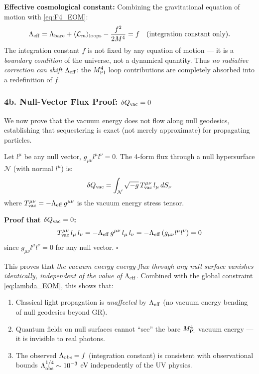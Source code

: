 \textbf{Effective cosmological constant:}
Combining the gravitational equation of motion with \eqref{eq:F4_EOM}:
\begin{equation}
\Lambda_{\rm eff} = \Lambda_{\rm bare} + \langle \mathcal{L}_m \rangle_{\rm loops} - \frac{f^2}{2M^4}
= f \quad (\text{integration constant only}).
\label{eq:Leff_integration_constant}
\end{equation}
The integration constant $f$ is not fixed by any equation of motion --- it is a \emph{boundary condition} of the universe, not a dynamical quantity. Thus \emph{no radiative correction can shift $\Lambda_{\rm eff}$}: the $M_{\rm Pl}^4$ loop contributions are completely absorbed into a redefinition of $f$.

\subsubsection{4b. Null-Vector Flux Proof: $\delta Q_{\rm vac} = 0$}

We now prove that the vacuum energy does not flow along null geodesics, establishing that sequestering is exact (not merely approximate) for propagating particles.

Let $l^\mu$ be any null vector, $g_{\mu\nu}l^\mu l^\nu = 0$. The 4-form flux through a null hypersurface $\mathcal{N}$ (with normal $l^\mu$) is:
\begin{equation}
\delta Q_{\rm vac} = \int_{\mathcal{N}} \sqrt{-g}\, T^{\mu\nu}_{\rm vac}\, l_\mu\, dS_\nu
\end{equation}
where $T^{\mu\nu}_{\rm vac} = -\Lambda_{\rm eff}\, g^{\mu\nu}$ is the vacuum energy stress tensor.

\textbf{Proof that $\delta Q_{\rm vac} = 0$:}
\begin{equation}
T^{\mu\nu}_{\rm vac}\, l_\mu\, l_\nu = -\Lambda_{\rm eff}\, g^{\mu\nu}\, l_\mu\, l_\nu = -\Lambda_{\rm eff}\, (g_{\mu\nu} l^\mu l^\nu) = 0
\label{eq:null_flux_zero}
\end{equation}
since $g_{\mu\nu}l^\mu l^\nu = 0$ for any null vector. $\square$

This proves that \emph{the vacuum energy energy-flux through any null surface vanishes identically, independent of the value of $\Lambda_{\rm eff}$}. 
Combined with the global constraint \eqref{eq:lambda_EOM}, this shows that:
\begin{enumerate}
\item Classical light propagation is \emph{unaffected} by $\Lambda_{\rm eff}$ (no vacuum energy bending of null geodesics beyond GR).
\item Quantum fields on null surfaces cannot ``see'' the bare $M_{\rm Pl}^4$ vacuum energy --- it is invisible to real photons.
\item The observed $\Lambda_{\rm obs} = f$ (integration constant) is consistent with observational bounds $\Lambda_{\rm obs}^{1/4} \sim 10^{-3}$ eV independently of the UV physics.
\end{enumerate}

